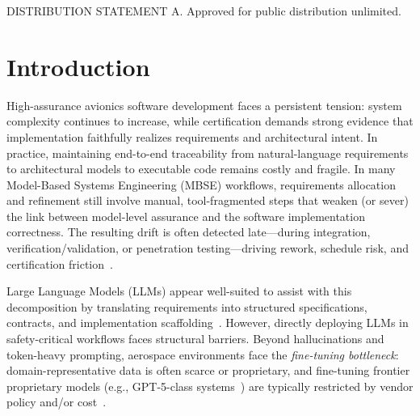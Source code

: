 \documentclass[conference]{IEEEtran}
\begin{document}
DISTRIBUTION STATEMENT A. Approved for public distribution unlimited.


\section{Introduction}

High-assurance avionics software development faces a persistent tension: system complexity continues to increase, while certification demands strong evidence that implementation faithfully realizes requirements and architectural intent. In practice, maintaining end-to-end traceability from natural-language requirements to architectural models to executable code remains costly and fragile. In many Model-Based Systems Engineering (MBSE) workflows, requirements allocation and refinement still involve manual, tool-fragmented steps that weaken (or sever) the link between model-level assurance and the software implementation correctness. The resulting drift is often detected late---during integration, verification/validation, or penetration testing---driving rework, schedule risk, and certification friction~\cite{hardin2025dasc}.

Large Language Models (LLMs) appear well-suited to assist with this decomposition by translating requirements into structured specifications, contracts, and implementation scaffolding~\cite{openai-gpt5-2-codex}. However, directly deploying LLMs in safety-critical workflows faces structural barriers. Beyond hallucinations and token-heavy prompting, aerospace environments face the \emph{fine-tuning bottleneck}: domain-representative data is often scarce or proprietary, and fine-tuning frontier proprietary models (e.g., GPT-5-class systems~\cite{bubeck2025earlyscienceaccelerationexperiments}) are typically restricted by vendor policy and/or cost~\cite{gpt5-system-card,openai-gpt5-2-codex}.
\end{document}
